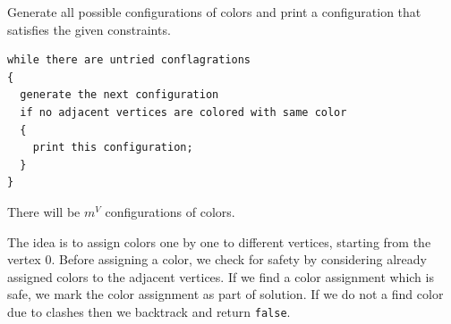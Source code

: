 Generate all possible configurations of colors and print a configuration
that satisfies the given constraints.
\begin{lstlisting}[style=raycppnewsnippet]
while there are untried conflagrations
{
  generate the next configuration
  if no adjacent vertices are colored with same color
  {
    print this configuration;
  }
}
\end{lstlisting}
There will be $m^V$ configurations of colors.


The idea is to assign colors one by one to different vertices, starting from
the vertex $0$. Before assigning a color, we check for safety by considering
already assigned colors to the adjacent vertices. If we find a color
assignment which is safe, we mark the color assignment as part of solution.
If we do not a find color due to clashes then we backtrack and return
\texttt{false}.

